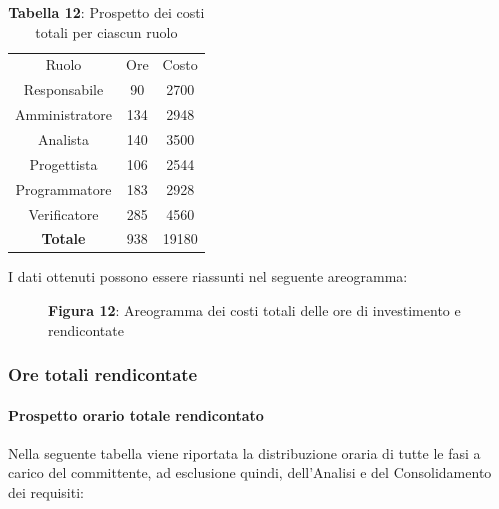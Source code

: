 \begin{table}[H]
	\centering
	\renewcommand{\arraystretch}{1.5}
	\begin{tabular}{|c|c|c|}
		\hline
		\rowcolor{lighter-grayer}
		Ruolo & Ore & Costo \\
Responsabile   & 90  & 2700  \\ \hline
Amministratore & 134 & 2948  \\ \hline
Analista       & 140 & 3500  \\ \hline
Progettista    & 106 & 2544  \\ \hline
Programmatore  & 183 & 2928  \\ \hline
Verificatore   & 285 & 4560  \\ \hline
\textbf{Totale}& 938 & 19180 \\ \hline
	\end{tabular}
	\caption*{\textbf{Tabella 12}: Prospetto dei costi totali per ciascun ruolo \\}
\end{table}

I dati ottenuti possono essere riassunti nel seguente areogramma:


\begin{figure}[H]
	\centering
	\caption*{\textbf{Figura 12}: Areogramma dei costi totali delle ore di investimento e rendicontate}
    \label{fig:Figura10}
\end{figure}

\subsubsection{Ore totali rendicontate}
\paragraph{Prospetto orario totale rendicontato}
Nella seguente tabella viene riportata la distribuzione oraria di tutte le fasi a carico del committente, ad esclusione quindi, dell'Analisi e del Consolidamento dei requisiti:

